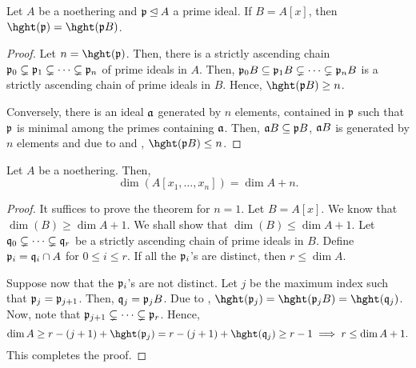 \begin{proposition}
    Let $A$ be a noethering and $\mathfrak p\unlhd A$ a prime ideal. If $B = A[x]$, then $\hght(\frakp) = \hght(\frakp B)$.
\end{proposition}
\begin{proof}
    Let $n = \hght(\frakp)$. Then, there is a strictly ascending chain $\mathfrak p_0\subsetneq\mathfrak p_1\subsetneq\dots\subsetneq\mathfrak p_n$ of prime ideals in $A$. Then, $\mathfrak p_0 B\subseteq\mathfrak p_1B\subsetneq\dots\subsetneq\mathfrak p_nB$ is a strictly ascending chain of prime ideals in $B$. Hence, $\hght(\frakp B)\ge n$.

    Conversely, there is an ideal $\mathfrak a$ generated by $n$ elements, contained in $\mathfrak p$ such that $\mathfrak p$ is minimal among the primes containing $\mathfrak a$. Then, $\mathfrak a B\subseteq\mathfrak p B$, $\mathfrak a B$ is generated by $n$ elements and due to  and , $\hght(\frakp B)\le n$.
\end{proof}

\begin{theorem}
    Let $A$ be a noethering. Then, 
    \begin{equation*}
        \dim(A[x_1,\dots,x_n]) = \dim A + n.
    \end{equation*}
\end{theorem}
\begin{proof}
    It suffices to prove the theorem for $n = 1$. Let $B = A[x]$. We know that $\dim(B)\ge\dim A + 1$. We shall show that $\dim(B)\le\dim A + 1$. Let $\mathfrak q_0\subsetneq\dots\subsetneq\mathfrak q_r$ be a strictly ascending chain of prime ideals in $B$. Define $\mathfrak p_i = \mathfrak q_i\cap A$ for $0\le i\le r$. If all the $\mathfrak p_i$'s are distinct, then $r\le\dim A$.

    Suppose now that the $\mathfrak p_i$'s are not distinct. Let $j$ be the maximum index such that $\mathfrak p_j = \mathfrak p_{j + 1}$. Then, $\mathfrak q_j = \mathfrak p_j B$. Due to , $\hght(\frakp_j) = \hght(\frakp_j B) = \hght(\frakq_j)$. Now, note that $\mathfrak p_{j + 1}\subsetneq\dots\subsetneq\mathfrak p_{r}$. Hence, 
    \begin{equation*}
        \dim A\ge r - (j + 1) + \hght(\frakp_j) = r - (j + 1) + \hght(\frakq_j)\ge r - 1 \implies r\le\dim A + 1.
    \end{equation*}
    This completes the proof.
\end{proof}

